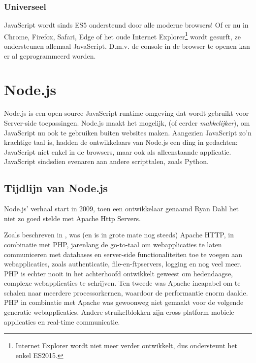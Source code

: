 \subsubsection{Universeel}
\label{sec:universal}

JavaScript wordt sinds ES5 ondersteund door alle moderne browsers! Of er nu in Chrome, Firefox, Safari, Edge of het oude Internet Explorer\footnote{Internet Explorer wordt niet meer verder ontwikkelt, dus ondersteunt het enkel ES2015.} wordt gesurft, ze ondersteunen allemaal JavaScript. D.m.v. de console in de browser te openen kan er al geprogrammeerd worden.





\section{Node.js}
\label{sec:nodeJs}

Node.js is een open-source JavaScript runtime omgeving dat wordt gebruikt voor Server-side toepassingen. Node.js maakt het mogelijk, (of eerder \textit{makkelijker}), om JavaScript nu ook te gebruiken buiten websites maken. Aangezien JavaScript zo'n krachtige taal is, hadden de ontwikkelaars van Node.js een ding in gedachten: JavaScript niet enkel in de browsers, maar ook als alleenstaande applicatie. JavaScript sindsdien evenaren aan andere scripttalen, zoals Python. \textcite{Patel2018}

\subsection{Tijdlijn van Node.js}
\label{sec:nodeTimeline}
Node.js' verhaal start in 2009, toen een ontwikkelaar genaamd Ryan Dahl het niet zo goed stelde met Apache Http Servers. 

Zoals beschreven in \autocite{Chaniotis2015}, was (en is in grote mate nog steeds) Apache HTTP, in combinatie met PHP, jarenlang de go-to-taal om webapplicaties te laten communiceren met databases en server-side functionaliteiten toe te voegen aan webapplicaties, zoals authenticatie, file-en-ftpservers, logging en nog veel meer. PHP is echter nooit in het achterhoofd ontwikkelt geweest om hedendaagse, complexe webapplicaties te schrijven. Ten tweede was Apache incapabel om te schalen naar meerdere processorkernen, waardoor de performantie enorm daalde. PHP in combinatie met Apache was gewoonweg niet gemaakt voor de volgende generatie webapplicaties. Andere struikelblokken zijn cross-platform mobiele applicaties en real-time communicatie.

